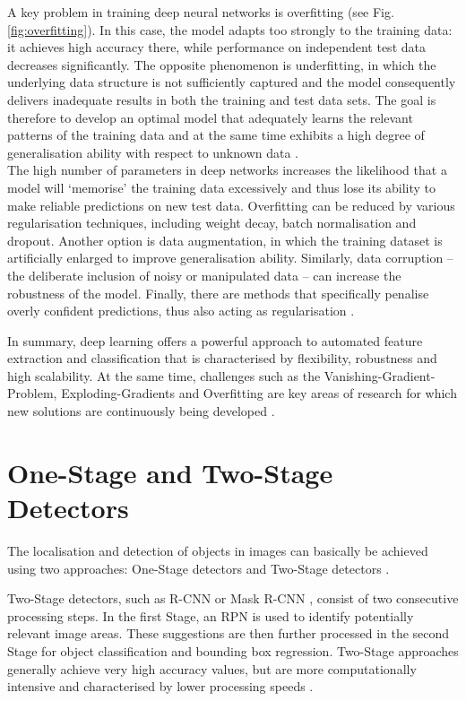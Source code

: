 A key problem in training deep neural networks is overfitting (see Fig. \ref{fig:overfitting}). In this case, the model adapts too strongly to the training data: it achieves high accuracy there, while performance on independent test data decreases significantly. The opposite phenomenon is underfitting, in which the underlying data structure is not sufficiently captured and the model consequently delivers inadequate results in both the training and test data sets. The goal is therefore to develop an optimal model that adequately learns the relevant patterns of the training data and at the same time exhibits a high degree of generalisation ability with respect to unknown data \cite{overfitting_pic}.\\
The high number of parameters in deep networks increases the likelihood that a model will ‘memorise’ the training data excessively and thus lose its ability to make reliable predictions on new test data. Overfitting can be reduced by various regularisation techniques, including weight decay, batch normalisation and dropout. Another option is data augmentation, in which the training dataset is artificially enlarged to improve generalisation ability. Similarly, data corruption – the deliberate inclusion of noisy or manipulated data – can increase the robustness of the model. Finally, there are methods that specifically penalise overly confident predictions, thus also acting as regularisation \cite{Alzubaidi2021}.

In summary, deep learning offers a powerful approach to automated feature extraction and classification that is characterised by flexibility, robustness and high scalability. At the same time, challenges such as the Vanishing-Gradient-Problem, Exploding-Gradients and Overfitting are key areas of research for which new solutions are continuously being developed \cite{Alzubaidi2021}.
 








\section{One-Stage and Two-Stage Detectors}

The localisation and detection of objects in images can basically be achieved using two approaches: One-Stage detectors and Two-Stage detectors \cite{Soviany2018}.

Two-Stage detectors, such as \Acrfull{R-CNN} \cite{ren2016} or Mask \acrshort{R-CNN} \cite{he2018}, consist of two consecutive processing steps. In the first Stage, an \Acrfull{RPN} is used to identify potentially relevant image areas. These suggestions are then further processed in the second Stage for object classification and bounding box regression. Two-Stage approaches generally achieve very high accuracy values, but are more computationally intensive and characterised by lower processing speeds \cite{Soviany2018}.

